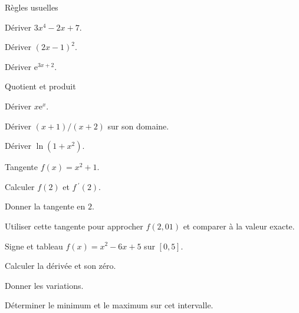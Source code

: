 \exercices
{}
\begingroup\renewcommand{\otBesoinPlace}[1]{}\begin{minipage}{\linewidth}
\begin{exercice}[1]{Règles usuelles}

\begin{questions}
\item Dériver $3x^4-2x+7$.
\item Dériver $(2x-1)^2$.
\item Dériver $\mathrm e^{3x+2}$.
\end{questions}
\end{exercice}
\begin{exercice}[1]{Quotient et produit}

\begin{questions}
\item Dériver $x\mathrm e^x$.
\item Dériver $(x+1)/(x+2)$ sur son domaine.
\item Dériver $\ln(1+x^2)$.
\end{questions}
\end{exercice}
\begin{exercice}[1]{Tangente}
$f(x)=x^2+1$.
\begin{questions}
\item Calculer $f(2)$ et $f\,\!^{\prime}(2)$.
\item Donner la tangente en $2$.
\item Utiliser cette tangente pour approcher $f(2{,}01)$ et comparer à la valeur exacte.
\end{questions}
\end{exercice}
\begin{exercice}[1]{Signe et tableau}
$f(x)=x^2-6x+5$ sur $[0,5]$.
\begin{questions}
\item Calculer la dérivée et son zéro.
\item Donner les variations.
\item Déterminer le minimum et le maximum sur cet intervalle.
\end{questions}
\end{exercice}
\end{minipage}\endgroup
\clearpage
{}

